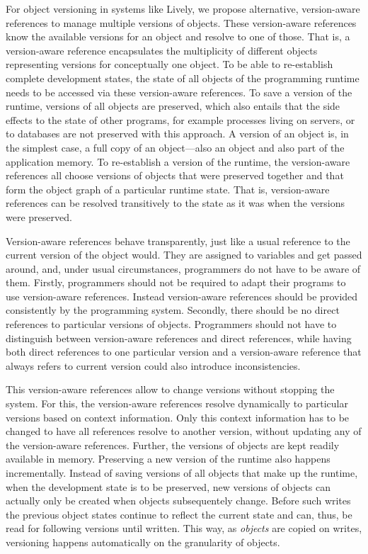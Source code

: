 For object versioning in systems like Lively, we propose alternative, version-aware references to manage multiple versions of objects.
These version-aware references know the available versions for an object and resolve to one of those.
That is, a version-aware reference encapsulates the multiplicity of different objects representing versions for conceptually one object.
To be able to re-establish complete development states, the state of all objects of the programming runtime needs to be accessed via these version-aware references.
To save a version of the runtime, versions of all objects are preserved, which also entails that the side effects to the state of other programs, for example processes living on servers, or to databases are not preserved with this approach.
A version of an object is, in the simplest case, a full copy of an object---also an object and also part of the application memory.
To re-establish a version of the runtime, the version-aware references all choose versions of objects that were preserved together and that form the object graph of a particular runtime state.
That is, version-aware references can be resolved transitively to the state as it was when the versions were preserved.

Version-aware references behave transparently, just like a usual reference to the current version of the object would.
They are assigned to variables and get passed around, and, under usual circumstances, programmers do not have to be aware of them.
Firstly, programmers should not be required to adapt their programs to use version-aware references.
Instead version-aware references should be provided consistently by the programming system.
Secondly, there should be no direct references to particular versions of objects.
Programmers should not have to distinguish between version-aware references and direct references, while having both direct references to one particular version and a version-aware reference that always refers to current version could also introduce inconsistencies.

This version-aware references allow to change versions without stopping the system.
For this, the version-aware references resolve dynamically to particular versions based on context information.
Only this context information has to be changed to have all references resolve to another version, without updating any of the version-aware references.
Further, the versions of objects are kept readily available in memory.
Preserving a new version of the runtime also happens incrementally.
Instead of saving versions of all objects that make up the runtime, when the development state is to be preserved, new versions of objects can actually only be created when objects subsequentely change.
Before such writes the previous object states continue to reflect the current state and can, thus, be read for following versions until written.
This way, as \emph{objects} are copied on writes, versioning happens automatically on the granularity of objects.

